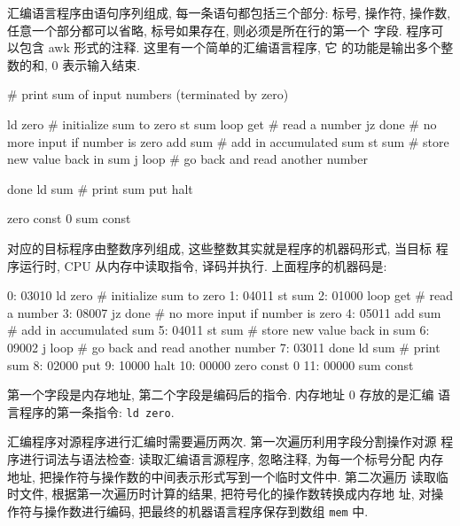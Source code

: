 汇编语言程序由语句序列组成, 每一条语句都包括三个部分: 标号, 操作符, 
操作数, 任意一个部分都可以省略, 标号如果存在, 则必须是所在行的第一个
字段. 程序可以包含 awk 形式的注释. 这里有一个简单的汇编语言程序, 它
的功能是输出多个整数的和, 0 表示输入结束.
\begin{file}
    # print sum of input numbers (terminated by zero)

         ld    zero   # initialize sum to zero
         st    sum
    loop get          # read a number
         jz    done   # no more input if number is zero
         add   sum    # add in accumulated sum
         st    sum    # store new value back in sum
         j     loop   # go back and read another number

    done ld    sum    # print sum
         put
         halt

    zero const 0
    sum  const
\end{file}

对应的目标程序由整数序列组成, 这些整数其实就是程序的机器码形式, 当目标
程序运行时, CPU 从内存中读取指令, 译码并执行. 上面程序的机器码是:
\begin{file}
     0: 03010           ld      zero    # initialize sum to zero
     1: 04011           st      sum
     2: 01000      loop get             # read a number
     3: 08007           jz      done    # no more input if number is zero
     4: 05011           add     sum     # add in accumulated sum
     5: 04011           st      sum     # store new value back in sum
     6: 09002           j       loop    # go back and read another number
     7: 03011      done ld      sum     # print sum
     8: 02000           put
     9: 10000           halt
    10: 00000      zero const 0
    11: 00000      sum  const
\end{file}
第一个字段是内存地址, 第二个字段是编码后的指令. 内存地址 0 存放的是汇编
语言程序的第一条指令: \texttt{ld zero}.

汇编程序对源程序进行汇编时需要遍历两次. 第一次遍历利用字段分割操作对源
程序进行词法与语法检查: 读取汇编语言源程序, 忽略注释, 为每一个标号分配
内存地址, 把操作符与操作数的中间表示形式写到一个临时文件中. 第二次遍历
读取临时文件, 根据第一次遍历时计算的结果, 把符号化的操作数转换成内存地
址, 对操作符与操作数进行编码, 把最终的机器语言程序保存到数组 \texttt{mem}
中.

